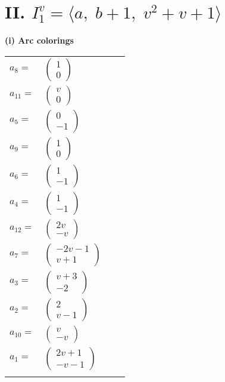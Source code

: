 \documentclass[1p]{elsarticle_modified}
\theoremstyle{definition}
\begin{document}
\centering \section*{II. $I^v_{1}= \langle a,\;b+1,\;v^2+v+1 \rangle$}
\flushleft \textbf{(i) Arc colorings}\\
\begin{tabular}{m{7pt} m{180pt} m{7pt} m{180pt} }
\flushright $a_{8}=$&$\begin{pmatrix}1\\0\end{pmatrix}$ \\
\flushright $a_{11}=$&$\begin{pmatrix}v\\0\end{pmatrix}$ \\
\flushright $a_{5}=$&$\begin{pmatrix}0\\-1\end{pmatrix}$ \\
\flushright $a_{9}=$&$\begin{pmatrix}1\\0\end{pmatrix}$ \\
\flushright $a_{6}=$&$\begin{pmatrix}1\\-1\end{pmatrix}$ \\
\flushright $a_{4}=$&$\begin{pmatrix}1\\-1\end{pmatrix}$ \\
\flushright $a_{12}=$&$\begin{pmatrix}2 v\\- v\end{pmatrix}$ \\
\flushright $a_{7}=$&$\begin{pmatrix}-2 v-1\\v+1\end{pmatrix}$ \\
\flushright $a_{3}=$&$\begin{pmatrix}v+3\\-2\end{pmatrix}$ \\
\flushright $a_{2}=$&$\begin{pmatrix}2\\v-1\end{pmatrix}$ \\
\flushright $a_{10}=$&$\begin{pmatrix}v\\- v\end{pmatrix}$ \\
\flushright $a_{1}=$&$\begin{pmatrix}2 v+1\\- v-1\end{pmatrix}$\\&\end{tabular}
\end{document}
